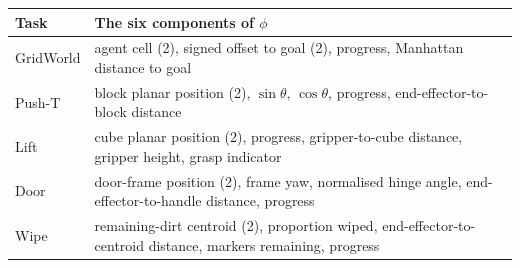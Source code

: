 \documentclass[
  11pt,
]{article}
\begin{document}
\begin{longtable}[]{@{}ll@{}}
\toprule
\begin{minipage}[b]{0.47\columnwidth}\raggedright
Task\strut
\end{minipage} & \begin{minipage}[b]{0.47\columnwidth}\raggedright
The six components of \(\phi\)\strut
\end{minipage}\tabularnewline
\midrule
\endhead
\begin{minipage}[t]{0.47\columnwidth}\raggedright
GridWorld\strut
\end{minipage} & \begin{minipage}[t]{0.47\columnwidth}\raggedright
agent cell (2), signed offset to goal (2), progress, Manhattan distance
to goal\strut
\end{minipage}\tabularnewline
\begin{minipage}[t]{0.47\columnwidth}\raggedright
Push-T\strut
\end{minipage} & \begin{minipage}[t]{0.47\columnwidth}\raggedright
block planar position (2), \(\sin\theta\), \(\cos\theta\), progress,
end-effector-to-block distance\strut
\end{minipage}\tabularnewline
\begin{minipage}[t]{0.47\columnwidth}\raggedright
Lift\strut
\end{minipage} & \begin{minipage}[t]{0.47\columnwidth}\raggedright
cube planar position (2), progress, gripper-to-cube distance, gripper
height, grasp indicator\strut
\end{minipage}\tabularnewline
\begin{minipage}[t]{0.47\columnwidth}\raggedright
Door\strut
\end{minipage} & \begin{minipage}[t]{0.47\columnwidth}\raggedright
door-frame position (2), frame yaw, normalised hinge angle,
end-effector-to-handle distance, progress\strut
\end{minipage}\tabularnewline
\begin{minipage}[t]{0.47\columnwidth}\raggedright
Wipe\strut
\end{minipage} & \begin{minipage}[t]{0.47\columnwidth}\raggedright
remaining-dirt centroid (2), proportion wiped, end-effector-to-centroid
distance, markers remaining, progress\strut
\end{minipage}\tabularnewline
\bottomrule
\end{longtable}
\end{document}
